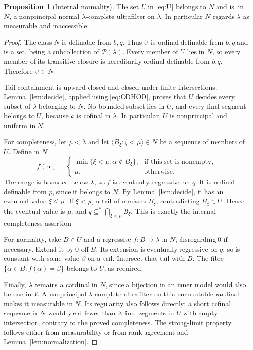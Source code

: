 \documentclass[11pt,letterpaper]{article}
\theoremstyle{definition}
\newtheorem{proposition}[definition]{Proposition}
\numberwithin{equation}{section}
\newcommand{\Pow}{\mathcal P}
\newcommand{\substar}{\subseteq^{*}}
\begin{document}
\begin{proposition}[Internal normality]\label{prop:U}
The set $U$ in \eqref{eq:U} belongs to $N$ and is, in $N$, a nonprincipal normal $\lambda$-complete ultrafilter on $\lambda$. In particular $N$ regards $\lambda$ as measurable and inaccessible.
\end{proposition}

\begin{proof}
The class $N$ is definable from $b,q$. Thus $U$ is ordinal definable from $b,q$ and is a set, being a subcollection of $\Pow(\lambda)$. Every member of $U$ lies in $N$, so every member of its transitive closure is hereditarily ordinal definable from $b,q$. Therefore $U\in N$.

Tail containment is upward closed and closed under finite intersections. Lemma~\ref{lem:decide}, applied using \eqref{eq:ODHOD}, proves that $U$ decides every subset of $\lambda$ belonging to $N$. No bounded subset lies in $U$, and every final segment belongs to $U$, because $a$ is cofinal in $\lambda$. In particular, $U$ is nonprincipal and uniform in $N$.

For completeness, let $\mu<\lambda$ and let $\langle B_\xi:\xi<\mu\rangle\in N$ be a sequence of members of $U$. Define in $N$
\[
 f(\alpha)=
 \begin{cases}
 \min\{\xi<\mu:\alpha\notin B_\xi\},&\text{if this set is nonempty},\\
 \mu,&\text{otherwise}.
 \end{cases}
\]
The range is bounded below $\lambda$, so $f$ is eventually regressive on $q$. It is ordinal definable from $p$, since it belongs to $N$. By Lemma~\ref{lem:decide}, it has an eventual value $\xi\le\mu$. If $\xi<\mu$, a tail of $a$ misses $B_\xi$, contradicting $B_\xi\in U$. Hence the eventual value is $\mu$, and
$q\substar\bigcap_{\xi<\mu}B_\xi$. This is exactly the internal completeness assertion.

For normality, take $B\in U$ and a regressive $f:B\to\lambda$ in $N$, disregarding $0$ if necessary. Extend it by $0$ off $B$. Its extension is eventually regressive on $q$, so is constant with some value $\beta$ on a tail. Intersect that tail with $B$. The fibre $\{\alpha\in B:f(\alpha)=\beta\}$ belongs to $U$, as required.

Finally, $\lambda$ remains a cardinal in $N$, since a bijection in an inner model would also be one in $V$. A nonprincipal $\lambda$-complete ultrafilter on this uncountable cardinal makes it measurable in $N$. Its regularity also follows directly: a short cofinal sequence in $N$ would yield fewer than $\lambda$ final segments in $U$ with empty intersection, contrary to the proved completeness. The strong-limit property follows either from measurability or from rank agreement and Lemma~\ref{lem:normalization}.
\end{proof}
\end{document}
